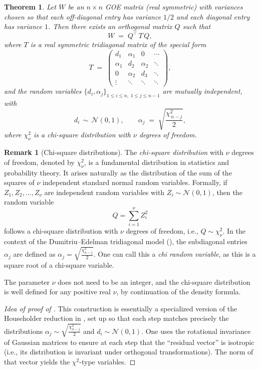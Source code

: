 \documentclass[letterpaper,11pt,oneside,reqno]{book}
\numberwithin{equation}{chapter}  %
\newtheorem{theorem}[proposition]{Theorem}
\theoremstyle{definition}
\newtheorem{remark}[proposition]{Remark}
\begin{document}
\begin{theorem}
\label{lecture3:thm:DE-model}
Let \(W\) be an \(n\times n\) GOE matrix (real symmetric) with variances chosen so that each off-diagonal entry has variance \(1/2\) and each diagonal entry has variance \(1\).  Then there exists an orthogonal matrix \(Q\) such that
\[
   W \;=\; Q^\top\,T\,Q,
\]
where \(T\) is a real symmetric tridiagonal matrix of the special form
\[
   T \;=\; \begin{pmatrix}
         d_1 & \alpha_1 & 0 & \cdots \\
         \alpha_1 & d_2 & \alpha_2 & \ddots \\
         0 & \alpha_2 & d_3 & \ddots \\
         \vdots & \ddots & \ddots & \ddots
       \end{pmatrix},
\]
and the random variables \(\{d_i,\alpha_j\}_{1 \le i \le n,\;1\le j\le n-1}\) are mutually independent, with
\[
  d_i \,\sim\, \mathcal{N}(0,1),
  \qquad
  \alpha_j \;=\; \sqrt{\frac{\chi^2_{\,n-j}}{2}},
\]
where \(\chi^2_{\nu}\) is a chi-square distribution with \(\nu\) degrees of freedom.
\end{theorem}

\begin{remark}[Chi-square distributions]
The \emph{chi-square distribution} with \(\nu\) degrees of
freedom, denoted by \(\chi^2_{\nu}\), is a fundamental
distribution in statistics and probability theory. It arises
naturally as the distribution of the sum of the squares of
\(\nu\) independent standard normal random variables.
Formally, if \(Z_1, Z_2, \ldots, Z_{\nu}\) are independent
random variables with \(Z_i \sim \mathcal{N}(0,1)\), then
the random variable
\[
  Q = \sum_{i=1}^{\nu} Z_i^2
\]
follows a chi-square distribution with \(\nu\) degrees of
freedom, i.e., \(Q \sim \chi^2_{\nu}\). In the context of
the Dumitriu–Edelman tridiagonal model
(), the subdiagonal entries \(\alpha_j\)
are defined as \(\alpha_j = \sqrt{\frac{\chi^2_{n-j}}{2}}\).
One can call this a \emph{chi random variable},
as this is a square root of a chi-square variable.

The parameter $\nu$ does not need to be an integer, and the
chi-square distribution is well defined for any positive
real $\nu$, by continuation of the density formula.
\end{remark}

\begin{proof}[Idea of proof of ]
	This construction is essentially a specialized version of
	the Householder reduction in , set up
	so that each step matches precisely the distributions
	\(\alpha_j\sim \sqrt{\tfrac{\chi^2_{n-j}}{2}}\) and
	\(d_i\sim\mathcal{N}(0,1)\).  One uses the rotational
	invariance of Gaussian matrices to ensure at each step that
	the ``residual vector'' is isotropic (i.e., its distribution
	is invariant under orthogonal transformations).  The norm
	of that vector yields the \(\chi^2\)-type variables.
\end{proof}
\end{document}
